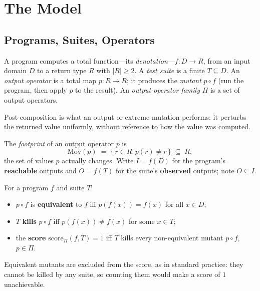 \documentclass[runningheads,envcountsect,envcountsame]{llncs}
\newcommand{\Mov}{\mathrm{Mov}}
\newcommand{\score}{\mathrm{score}}
\begin{document}
\section{The Model}
\label{sec:model}

\subsection{Programs, Suites, Operators}

\begin{definition}
\label{def:program}
A program computes a total function---its \emph{denotation}---$f : D \to R$, from
an input domain $D$ to a return type $R$ with $|R| \ge 2$. A \emph{test suite} is
a finite $T \subseteq D$. An \emph{output operator} is a total map $p : R \to R$;
it produces the \emph{mutant} $p \circ f$ (run the program, then apply $p$ to the
result). An \emph{output-operator family} $\Pi$ is a set of output operators.
\end{definition}

Post-composition is what an output or extreme mutation performs: it perturbs the
returned value uniformly, without reference to how the value was computed.

\begin{definition}[footprint]
\label{def:footprint}
The \emph{footprint} of an output operator $p$ is
\[
  \Mov(p) \;=\; \{\, r \in R : p(r) \neq r \,\} \;\subseteq\; R,
\]
the set of values $p$ actually changes. Write $I = f(D)$ for the program's
\textbf{reachable} outputs and $O = f(T)$ for the suite's \textbf{observed}
outputs; note $O \subseteq I$.
\end{definition}

\begin{definition}
\label{def:score}
For a program $f$ and suite $T$:
\begin{itemize}
\item $p \circ f$ is \textbf{equivalent} to $f$ iff $p(f(x)) = f(x)$ for all
$x \in D$;
\item $T$ \textbf{kills} $p \circ f$ iff $p(f(x)) \neq f(x)$ for some $x \in T$;
\item the \textbf{score} $\score_\Pi(f,T) = 1$ iff $T$ kills every non-equivalent
mutant $p \circ f$, $p \in \Pi$.
\end{itemize}
\end{definition}

Equivalent mutants are excluded from the score, as in standard practice: they
cannot be killed by any suite, so counting them would make a score of $1$
unachievable.
\end{document}
